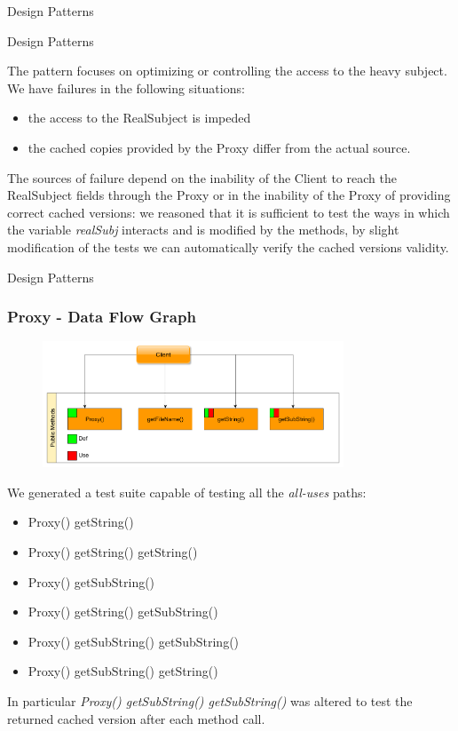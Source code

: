 \documentclass{beamer}
\begin{document}
\begin{section}{Design Patterns}
\begin{subsection}{Design Patterns}
\begin{frame}
		The pattern focuses on optimizing or controlling the access to the heavy subject. We have failures in the following situations:  
		\begin{itemize}
			\item the access to the RealSubject is impeded
			\item the cached copies provided by the Proxy differ from the actual source.
		\end{itemize}
		\vspace{5mm}
	The sources of failure depend on the inability of the Client to reach the RealSubject fields through the Proxy or in the inability of the Proxy of providing correct cached versions:  we reasoned that it is sufficient to test the ways in which the variable \textit{realSubj} interacts and is modified by the methods, by slight modification of the tests we can automatically verify the cached versions validity. 
		
	\end{frame}
\end{subsection}



\begin{subsection}{Design Patterns}
	\begin{frame}
		\frametitle{Proxy - Data Flow Graph}
		\begin{figure}[!h]
		\centering
		\includegraphics[width=0.8\textwidth]{./Proxy/CallGraph.png}
		
		\label{Prodataflow}
	\end{figure}
		{\footnotesize We generated a test suite capable of testing all the \textit{all-uses} paths:
		\begin{itemize}
			\item Proxy() getString() 
			\item Proxy() getString() getString()
			\item Proxy() getSubString()
			\item Proxy() getString() getSubString()
			\item Proxy() getSubString() getSubString()
			\item Proxy() getSubString() getString()			
		\end{itemize}
		}In particular  \textit{Proxy() getSubString() getSubString()} was altered to test the returned cached version after each method call. 		
	\end{frame}
\end{subsection}


\end{section}
\end{document}
